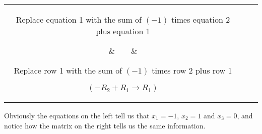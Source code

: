 {\begin{center}
\begin{tabular}{ccc}
\parbox{120pt}{\centering\small Replace equation 1 with the sum of $(-1)$ times equation 2 plus equation 1}
&$\quad \quad$&
\parbox{120pt}{\centering\small Replace row 1 with the sum of $(-1)$ times row 2 plus row 1

$(-R_2+R_1\rightarrow R_1)$}
\\
\\
$\begin{array}{ccccccc}
x_1& &   &&&=&-1\\
   & &x_2&&&=&1\\
   & &   & &x_3&=&0
\end{array}$
&$\quad \quad$&
$\bam{3}
1&0&0&-1\\ 0&1&0&1\\ 0&0&1&0\\
\eam$
\end{tabular}
\end{center}

Obviously the equations on the left tell us that $x_1 = -1$, $x_2 = 1$ and $x_3=0$, and notice how the matrix on the right tells us the same information. }\\




